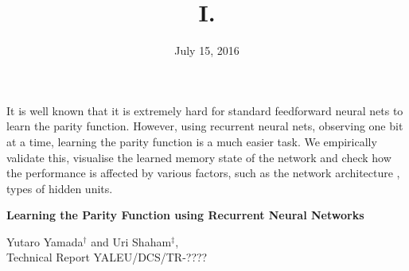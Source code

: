 \documentclass[fleqn,11pt]{article}
\begin{document}
\title{I.}
\date{}
\author{}


{
\begin{titlepage}

\begin{center}
  \begin{minipage}[t]{6in}

It is well known that it is extremely hard for standard feedforward neural nets to learn the parity function. However, using recurrent neural nets, observing one bit at a time, learning the parity function is a much easier task. We empirically validate this, visualise the learned memory state of the network and check how the performance is affected by various factors, such as the network architecture ,
types of hidden units.

 \vspace{ -100.0in}

 \end{minipage}

\end{center}

\vspace{ 2.70in}

\begin{center}

  \begin{minipage}[t]{4.4in}

\begin{center}


{\Large \bf Learning the Parity Function using Recurrent Neural Networks} \\

 \vspace{ 0.50in}

            Yutaro Yamada$\mbox{}^{\dagger}$ and Uri Shaham$\mbox{}^{\ddagger}$, \\
            Technical Report YALEU/DCS/TR-???? \\
            \date{July 15, 2016}

\end{center}

 \vspace{ -100.0in}


 \end{minipage}


\end{center}
\end{titlepage}}
\end{document}

